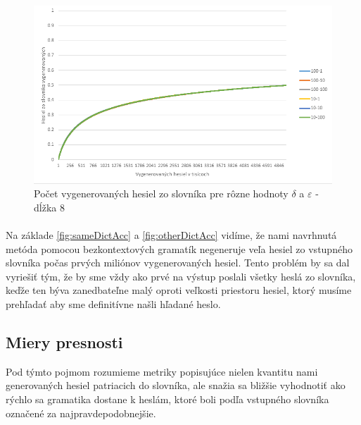 \begin{figure}[ht]
    \centering
    \includegraphics[width=1\textwidth]{sameDictAccMarkv2}
    \caption{Počet vygenerovaných hesiel zo slovníka pre rôzne hodnoty \(\delta\) a \(\varepsilon\) - dĺžka 8}
    \label{fig:MarkovV2}
\end{figure}

\paragraph{}
Na základe \ref{fig:sameDictAcc} a \ref{fig:otherDictAcc} vidíme, že nami navrhnutá metóda pomocou bezkontextových gramatík negeneruje veľa hesiel zo vstupného slovníka počas prvých miliónov vygenerovaných hesiel. Tento problém by sa dal vyriešiť tým, že by sme vždy ako prvé na výstup poslali všetky heslá zo slovníka, keďže ten býva zanedbateľne malý oproti veľkosti priestoru hesiel, ktorý musíme prehľadať aby sme definitívne našli hľadané heslo.

\subsection{Miery presnosti}
Pod týmto pojmom rozumieme metriky popisujúce nielen kvantitu nami generovaných hesiel patriacich do slovníka, ale snažia sa bližšie vyhodnotiť ako rýchlo sa gramatika dostane k heslám, ktoré boli podľa vstupného slovníka označené za najpravdepodobnejšie.

